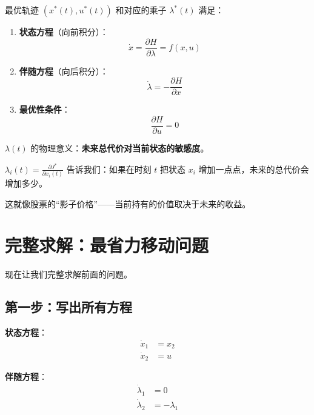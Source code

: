 \begin{keytheorem}[title=Pontryagin 最大值原理（简化版）]
最优轨迹 $(x^*(t), u^*(t))$ 和对应的乘子 $\lambda^*(t)$ 满足：

\begin{enumerate}
    \item \textbf{状态方程}（向前积分）：
    \[
    \dot{x} = \frac{\partial H}{\partial \lambda} = f(x, u)
    \]
    
    \item \textbf{伴随方程}（向后积分）：
    \[
    \dot{\lambda} = -\frac{\partial H}{\partial x}
    \]
    
    \item \textbf{最优性条件}：
    \[
    \frac{\partial H}{\partial u} = 0
    \]
\end{enumerate}
\end{keytheorem}

\begin{physicalmeaning}
$\lambda(t)$ 的物理意义：\textbf{未来总代价对当前状态的敏感度}。

$\lambda_i(t) = \frac{\partial J^*}{\partial x_i(t)}$ 告诉我们：如果在时刻 $t$ 把状态 $x_i$ 增加一点点，未来的总代价会增加多少。

这就像股票的“影子价格”——当前持有的价值取决于未来的收益。
\end{physicalmeaning}

\section{完整求解：最省力移动问题}

现在让我们完整求解前面的问题。

\subsection{第一步：写出所有方程}

\textbf{状态方程}：
\begin{align}
\dot{x}_1 &= x_2 \\
\dot{x}_2 &= u
\end{align}

\textbf{伴随方程}：
\begin{align}
\dot{\lambda}_1 &= 0 \\
\dot{\lambda}_2 &= -\lambda_1
\end{align}

